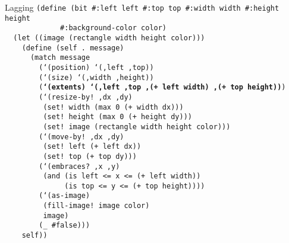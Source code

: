\begin{frame}{Lagging}
  \tiny
  \texttt{(define (bit \#:left left \#:top top \#:width width \#:height height\\
    \ \ \ \ \ \ \ \ \ \ \ \ \ \#:background-color color)\\
    \ \ (let ((image (rectangle width height color)))\\
    \ \ \ \ (define (self .\ message)\\
    \ \ \ \ \ \ (match message\\
    \ \ \ \ \ \ \ \ (`(position) `(,left ,top))\\
    \ \ \ \ \ \ \ \ (`(size) `(,width ,height))\\
    \ \ \ \ \ \ \ \ (\textbf{`(extents) `(,left ,top ,(+ left width) ,(+ top height))})\\
    \ \ \ \ \ \ \ \ (`(resize-by!\ ,dx ,dy)\\
    \ \ \ \ \ \ \ \ \ (set!\ width (max 0 (+ width dx)))\\
    \ \ \ \ \ \ \ \ \ (set!\ height (max 0 (+ height dy)))\\
    \ \ \ \ \ \ \ \ \ (set!\ image (rectangle width height color)))\\
    \ \ \ \ \ \ \ \ (`(move-by!\ ,dx ,dy)\\
    \ \ \ \ \ \ \ \ \ (set!\ left (+ left dx))\\
    \ \ \ \ \ \ \ \ \ (set!\ top (+ top dy)))\\
    \ \ \ \ \ \ \ \ (`(embraces?\ ,x ,y)\\
    \ \ \ \ \ \ \ \ \ (and (is left <= x <= (+ left width))\\
    \ \ \ \ \ \ \ \ \ \ \ \ \ \ (is top <= y <= (+ top height))))\\
    \ \ \ \ \ \ \ \ (`(as-image)\\
    \ \ \ \ \ \ \ \ \ (fill-image!\ image color)\\
    \ \ \ \ \ \ \ \ \ image)\\
    \ \ \ \ \ \ \ \ (\_ \#false)))\\
    \ \ \ \ self))
  }
\end{frame}

